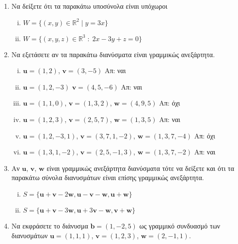 \begin{enumerate}
  \item Να δείξετε ότι τα παρακάτω υποσύνολα είναι υπόχωροι
    \begin{enumerate}[(i)]
      \item $ W = \{ (x,y) \in \mathbb{R}^{2} \mid y = 3x \} $ 
      \item $ W = \{(x,y,z)\in \mathbb{R}^{3} \; : \; 2x-3y+z=0 \} $
    \end{enumerate}

  \item\label{ask:lineks} Να εξετάσετε αν τα παρακάτω διανύσματα είναι γραμμικώς 
    ανεξάρτητα.
    \begin{enumerate}[(i)]
      \item $ \mathbf{u} = (1,2) $, $ \mathbf{v} = (3,-5) $ \hfill Απ: ναι
      \item $ \mathbf{u} = (1,2,-3) $ $ \mathbf{v} = (4,5,-6) $ \hfill Απ: ναι
      \item $ \mathbf{u} = (1,1,0)$, $ \mathbf{v} = (1,3,2)$, $ \mathbf{w} = (4,9,5) $ 
        \hfill Απ: όχι 
      \item $ \mathbf{u} = (1,2,3)$, $ \mathbf{v} = (2,5,7)$, $ \mathbf{w} = (1,3,5) $ 
        \hfill Απ: ναι 
      \item $ \mathbf{u} = (1,2,-3,1) $, $ \mathbf{v} = (3,7,1,-2) $, $ \mathbf{w} =
        (1,3,7,-4) $ \hfill Απ: όχι
      \item $ \mathbf{u} = (1,3,1,-2) $, $ \mathbf{v} = (2,5,-1,3) $, $ \mathbf{w} =
        (1,3,7,-2) $ \hfill Απ: ναι
    \end{enumerate}

  \item Αν $ \mathbf{u} $, $ \mathbf{v} $, $ \mathbf{w} $ είναι γραμμικώς 
    ανεξάρτητα διανύσματα τότε να δείξετε και ότι τα παρακάτω σύνολα διανυσμάτων 
    είναι επίσης γραμμικώς ανεξάρτητα.
    \begin{enumerate}[(i)]
      \item $ S = \{ \mathbf{u} + \mathbf{v} - 2 \mathbf{w}, \mathbf{u} - \mathbf{v} -
        \mathbf{w}, \mathbf{u} + \mathbf{w} \} $
      \item $ S = \{ \mathbf{u} + \mathbf{v} - 3 \mathbf{w}, \mathbf{u} + 3 \mathbf{v} -
        \mathbf{w}, \mathbf{v} + \mathbf{w}\}  $
    \end{enumerate}

  \item\label{ask:eksart} Να εκφράσετε το διάνυσμα $ \mathbf{b} = (1,-2,5) $ ως γραμμικό 
    συνδυασμό των διανυσμάτων $ \mathbf{u} = (1,1,1)$, $ \mathbf{v} = (1,2,3)$, 
    $ \mathbf{w} = (2,-1,1) $.


\end{enumerate}
